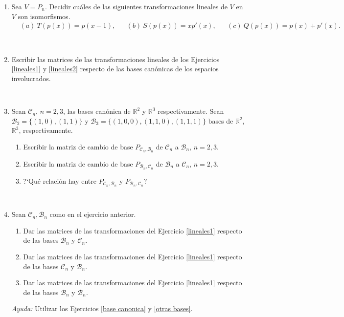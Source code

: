 \documentclass[11pt,spanish,makeidx]{amsbook}
\newcommand\R{\mathbb{R}}
\begin{document}
\begin{enumerate}
	\item Sea $V=P_n$. Decidir cu\'ales de las siguientes transformaciones  lineales de $V$ en
	$V$ son isomorfismos.
	\begin{align*}
	& (a) \ T(p(x))=p(x-1), && (b)  \ S(p(x))=xp'(x), && (c)  \  Q(p(x))=p(x)+p'(x).
	\end{align*}
		
	\	
	
	\item\label{base canonica} Escribir las matrices de las transformaciones lineales de los Ejercicios \ref{lineales1} y \ref{lineales2}
	respecto de las bases can\'onicas de los espacios involucrados.
		
	\
	
	\item\label{otras bases} Sean $\mathcal{C}_n$, $n=2,3$, las bases can\'onica de $\R^2$ y $\R^3$ respectivamente. Sean
	$\mathcal{B}_2=\{(1,0),(1,1)\}$ y $\mathcal{B}_3=\{(1,0,0),(1,1,0),(1,1,1)\}$ bases de $\R^2$, $\R^3$, respectivamente.
	\begin{enumerate}
		\item Escribir la matriz de cambio de base $P_{{\mathcal{C}_n},{\mathcal{B}_n}}$ de $\mathcal{C}_n$ a $\mathcal{B}_n$, $n=2,3$.
		\item Escribir la matriz de cambio de base $P_{{\mathcal{B}_n},{\mathcal{C}_n}}$ de $\mathcal{B}_n$ a $\mathcal{C}_n$, $n=2,3$.
		\item ?`Qu\'e relaci\'on hay entre $P_{{\mathcal{C}_n},{\mathcal{B}_n}}$ y $P_{{\mathcal{B}_n},{\mathcal{C}_n}}$?
	\end{enumerate}
		
	\
	
	\item \label{basesRn} Sean $\mathcal{C}_n, \mathcal{B}_n$ como en el ejercicio anterior.
	\begin{enumerate}
		\item Dar las matrices de las transformaciones del Ejercicio \ref{lineales1} respecto de las bases $\mathcal{B}_n$ y
		$\mathcal{C}_n$.
		\item Dar las matrices de las transformaciones del Ejercicio \ref{lineales1} respecto de las bases $\mathcal{C}_n$ y
		$\mathcal{B}_n$.
		\item Dar las matrices de las transformaciones del Ejercicio \ref{lineales1} respecto de las bases $\mathcal{B}_n$ y
		$\mathcal{B}_n$.
	\end{enumerate}
	{\it Ayuda:} Utilizar los Ejercicios \ref{base canonica} y \ref{otras bases}.
		

\end{enumerate}
\end{document}
